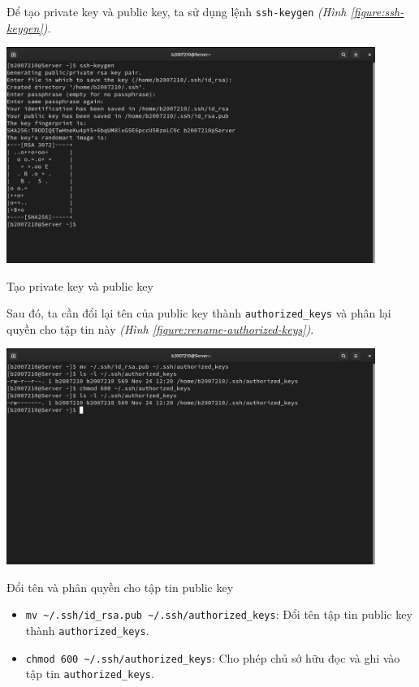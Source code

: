 \documentclass[a4paper, 11pt]{article}
\begin{document}
\begin{enumerate}
          Để tạo private key và public key, ta sử dụng lệnh \texttt{ssh-keygen} \textit{(Hình \ref{figure:ssh-keygen})}. \\
          \begin{minipage}
              {\linewidth}
              \captionsetup{type=figure}
              \centering
              \includegraphics[width=12cm]{images/ssh-keygen.png}
              \caption{Tạo private key và public key}
              \label{figure:ssh-keygen}
          \end{minipage}

          Sau đó, ta cần đổi lại tên của public key thành \texttt{authorized\_keys} và phân lại quyền cho tập tin này \textit{(Hình \ref{figure:rename-authorized-keys})}. \\
          \begin{minipage}
              {\linewidth}
              \captionsetup{type=figure}
              \centering
              \includegraphics[width=12cm]{images/rename-authorized-keys.png}
              \caption{Đổi tên và phân quyền cho tập tin public key}
              \label{figure:rename-authorized-keys}
          \end{minipage}

          \begin{itemize}
              \item \texttt{mv \textasciitilde/.ssh/id\_rsa.pub \textasciitilde/.ssh/authorized\_keys}: Đổi tên tập tin public key thành \texttt{authorized\_keys}.
              \item \texttt{chmod 600 \textasciitilde/.ssh/authorized\_keys}: Cho phép chủ sở hữu đọc và ghi vào tập tin \texttt{authorized\_keys}.
          \end{itemize}
\end{enumerate}
\end{document}
